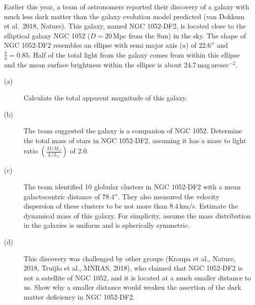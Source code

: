 Earlier this year, a team of astronomers reported their discovery of a galaxy
with much less dark matter than the galaxy evolution model predicted (van
Dokkum et al.\ 2018, Nature). This galaxy, named NGC 1052-DF2, is located
close to the elliptical galaxy NGC 1052 ($D = 20$\,Mpc from the Sun) in the
sky. The shape of NGC 1052-DF2 resembles an ellipse with semi major axis ($a$)
of $22.6''$ and $\frac{b}{a} = 0.85$. Half of the total light from the galaxy
comes from within this ellipse and the mean surface brightness within the
ellipse is about 24.7\,mag\,arcsec$^{-2}$.

\begin{description}
\item[(a)] Calculate the total apparent magnitude of this galaxy.
\item[(b)] The team suggested the galaxy is a companion of NGC 1052.
  Determine the total mass of stars in NGC 1052-DF2, assuming it has a mass to
  light ratio $\left(\frac{M/M_\odot}{L/L_\odot}\right)$ of 2.0.
\item[(c)] The team identified 10 globular clusters in NGC 1052-DF2 with a
  mean galactocentric distance of $78.4''$. They also measured the velocity
  dispersion of these clusters to be not more than 8.4\,km/s. Estimate the
  dynamical mass of this galaxy. For simplicity, assume the mass distribution
  in the galaxies is uniform and is spherically symmetric.
\item[(d)] This discovery was challenged by other groups (Kroupa et al.,
  Nature, 2018, Truijlo et al., MNRAS, 2018), who claimed that NGC 1052-DF2 is
  not a satellite of NGC 1052, and it is located at a much smaller distance to
  us. Show why a smaller distance would weaken the assertion of the dark
  matter deficiency in NGC 1052-DF2.
\end{description}
